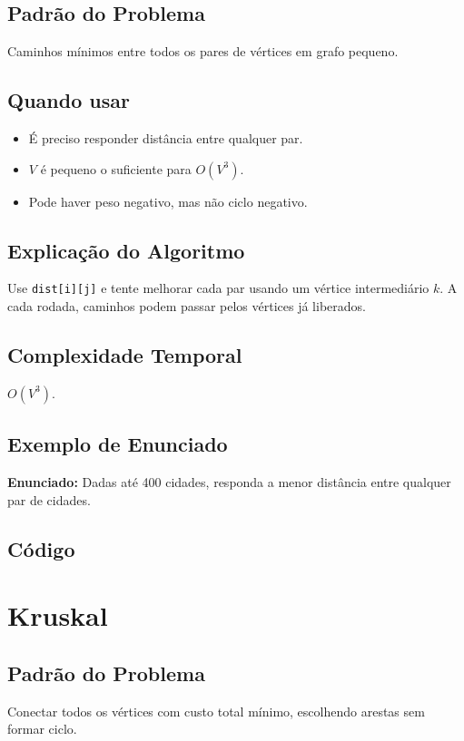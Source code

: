 \subsection{Padrão do Problema}
Caminhos mínimos entre todos os pares de vértices em grafo pequeno.

\subsection{Quando usar}
\begin{itemize}[nosep]
  \item É preciso responder distância entre qualquer par.
  \item $V$ é pequeno o suficiente para $O(V^3)$.
  \item Pode haver peso negativo, mas não ciclo negativo.
\end{itemize}

\subsection{Explicação do Algoritmo}
Use \texttt{dist[i][j]} e tente melhorar cada par usando um vértice intermediário $k$. A cada rodada, caminhos podem passar pelos vértices já liberados.

\subsection{Complexidade Temporal}
$O(V^3)$.

\subsection{Exemplo de Enunciado}
\begin{exemplodiabox}
\textbf{Enunciado:} Dadas até 400 cidades, responda a menor distância entre qualquer par de cidades.
\end{exemplodiabox}

\subsection{Código}

\section{Kruskal}

\subsection{Padrão do Problema}
Conectar todos os vértices com custo total mínimo, escolhendo arestas sem formar ciclo.

